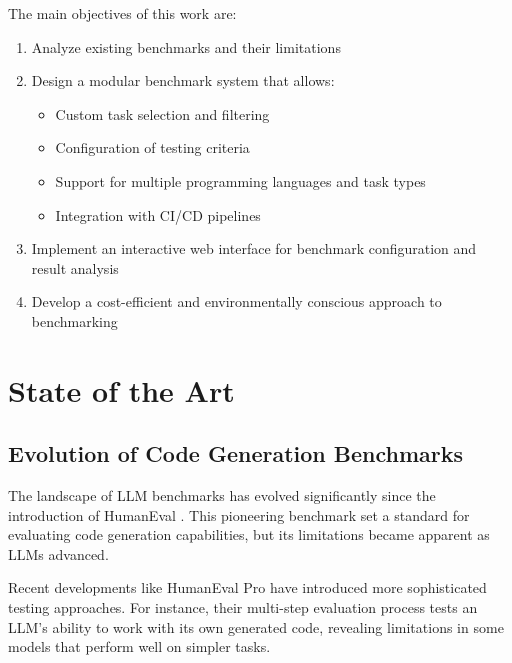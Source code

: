 The main objectives of this work are:
\begin{enumerate}
    \item Analyze existing benchmarks and their limitations
    \item Design a modular benchmark system that allows:
    \begin{itemize}
        \item Custom task selection and filtering
        \item Configuration of testing criteria
        \item Support for multiple programming languages and task types
        \item Integration with CI/CD pipelines
    \end{itemize}
    \item Implement an interactive web interface for benchmark configuration and result analysis
    \item Develop a cost-efficient and environmentally conscious approach to benchmarking
\end{enumerate}

\chapter{State of the Art}

\section{Evolution of Code Generation Benchmarks}

The landscape of LLM benchmarks has evolved significantly since the introduction of HumanEval \cite{chen2021evaluatinglargelanguagemodels}. This pioneering benchmark set a standard for evaluating code generation capabilities, but its limitations became apparent as LLMs advanced.

Recent developments like HumanEval Pro \cite{yu2024humanevalprombpppro} have introduced more sophisticated testing approaches. For instance, their multi-step evaluation process tests an LLM's ability to work with its own generated code, revealing limitations in some models that perform well on simpler tasks.


